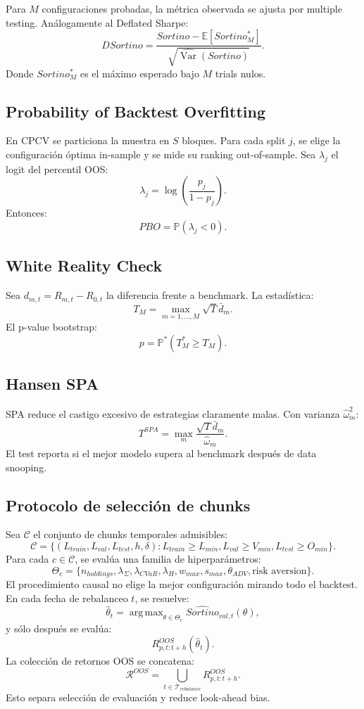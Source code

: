 \documentclass[11pt,letterpaper]{article}
\DeclareMathOperator*{\argmax}{arg\,max}
\DeclareMathOperator{\Var}{Var}
\newcommand{\E}{\mathbb{E}}
\newcommand{\Prob}{\mathbb{P}}
\newcommand{\1}{\mathbf{1}}
\begin{document}
Para \(M\) configuraciones probadas, la métrica observada se ajusta por multiple testing. Análogamente al Deflated Sharpe:
\[
    DSortino
    =
    \frac{Sortino-\E[Sortino^*_{M}]}
    {\sqrt{\widehat{\Var}(Sortino)}}.
\]
Donde \(Sortino^*_M\) es el máximo esperado bajo \(M\) trials nulos.

\subsection{Probability of Backtest Overfitting}

En CPCV se particiona la muestra en \(S\) bloques. Para cada split \(j\), se elige la configuración óptima in-sample y se mide su ranking out-of-sample. Sea \(\lambda_j\) el logit del percentil OOS:
\[
    \lambda_j
    =
    \log\left(
        \frac{p_j}{1-p_j}
    \right).
\]
Entonces:
\[
    PBO
    =
    \Prob(\lambda_j<0).
\]

\subsection{White Reality Check}

Sea \(d_{m,t}=R_{m,t}-R_{0,t}\) la diferencia frente a benchmark. La estadística:
\[
    T_M
    =
    \max_{m=1,\ldots,M}
    \sqrt{T}\bar d_m.
\]
El p-value bootstrap:
\[
    p
    =
    \Prob^*
    \left(
        T_M^* \ge T_M
    \right).
\]

\subsection{Hansen SPA}

SPA reduce el castigo excesivo de estrategias claramente malas. Con varianza \(\hat\omega_m^2\):
\[
    T^{SPA}
    =
    \max_m
    \frac{\sqrt{T}\bar d_m}{\hat\omega_m}.
\]
El test reporta si el mejor modelo supera al benchmark después de data snooping.

\subsection{Protocolo de selección de chunks}

Sea \(\mathcal{C}\) el conjunto de chunks temporales admisibles:
\[
    \mathcal{C}
    =
    \{
        (L_{train},L_{val},L_{test},h,\delta):
        L_{train}\ge L_{min},
        L_{val}\ge V_{min},
        L_{test}\ge O_{min}
    \}.
\]
Para cada \(c\in\mathcal{C}\), se evalúa una familia de hiperparámetros:
\[
    \Theta_c =
    \{
        n_{holdings},\lambda_\Sigma,\lambda_{CVaR},\lambda_H,
        w_{max},s_{max},\theta_{ADV},\text{risk aversion}
    \}.
\]
El procedimiento causal no elige la mejor configuración mirando todo el backtest. En cada fecha de rebalanceo \(t\), se resuelve:
\[
    \hat\theta_t
    =
    \argmax_{\theta\in\Theta_c}
    \widehat{Sortino}_{val,t}(\theta),
\]
y sólo después se evalúa:
\[
    R^{OOS}_{p,t:t+h}(\hat\theta_t).
\]
La colección de retornos OOS se concatena:
\[
    \mathcal{R}^{OOS}
    =
    \bigcup_{t\in\mathcal{T}_{rebalance}}
    R^{OOS}_{p,t:t+h}.
\]
Esto separa selección de evaluación y reduce look-ahead bias.
\end{document}
